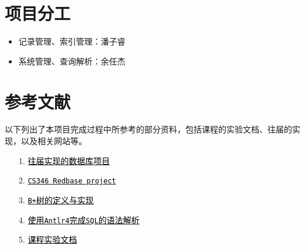 \documentclass[11pt]{article}
\begin{document}
\section{项目分工}
\begin{itemize}
    \item 记录管理、索引管理：潘子睿
    \item 系统管理、查询解析：余任杰
\end{itemize}

\section{参考文献}
以下列出了本项目完成过程中所参考的部分资料，包括课程的实验文档、往届的实现，以及相关网站等。
\begin{itemize}
    \item[1.] \href{https://github.com/miskcoo/TrivialDB}{\textcolor{black}{往届实现的数据库项目}}
    \item[2.] \href{https://web.stanford.edu/class/cs346/2015/redbase.html}{\textcolor{black}{\texttt{CS346 Redbase project}}}
    \item[3.] \href{https://en.wikipedia.org/wiki/B%2B_tree}{\textcolor{black}{\texttt{B+}树的定义与实现}}
    \item[4.] \href{https://www.antlr.org/download.html}{\textcolor{black}{使用\texttt{Antlr4}完成\texttt{SQL}的语法解析}}
    \item[5.] \href{https://thu-db.github.io/dbs-tutorial/}{\textcolor{black}{课程实验文档}}
\end{itemize}
\end{document}
